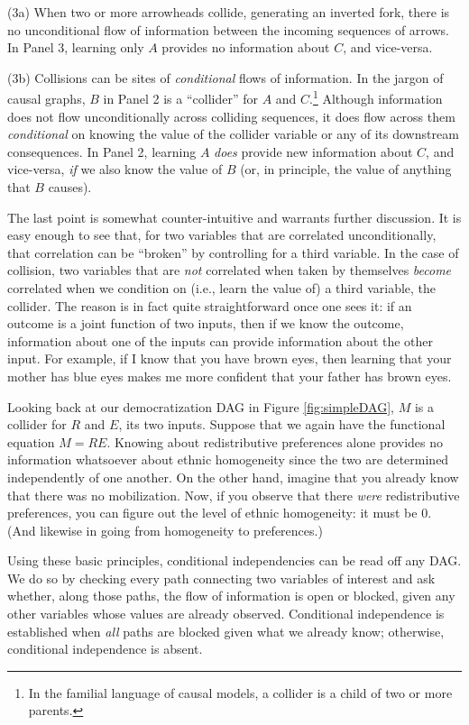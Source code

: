 \documentclass[12pt,]{book}
\let\rmarkdownfootnote\footnote%
\def\footnote{\protect\rmarkdownfootnote}
\begin{document}
(3a) When two or more arrowheads collide, generating an inverted fork, there is no unconditional flow of information between the incoming sequences of arrows. In Panel 3, learning only \(A\) provides no information about \(C\), and vice-versa.

(3b) Collisions can be sites of \emph{conditional} flows of information. In the jargon of causal graphs, \(B\) in Panel 2 is a ``collider'' for \(A\) and \(C\).\footnote{In the familial language of causal models, a collider is a child of two or more parents.} Although information does not flow unconditionally across colliding sequences, it does flow across them \emph{conditional} on knowing the value of the collider variable or any of its downstream consequences. In Panel 2, learning \(A\) \emph{does} provide new information about \(C\), and vice-versa, \emph{if} we also know the value of \(B\) (or, in principle, the value of anything that \(B\) causes).

The last point is somewhat counter-intuitive and warrants further discussion. It is easy enough to see that, for two variables that are correlated unconditionally, that correlation can be ``broken'' by controlling for a third variable. In the case of collision, two variables that are \emph{not} correlated when taken by themselves \emph{become} correlated when we condition on (i.e., learn the value of) a third variable, the collider. The reason is in fact quite straightforward once one sees it: if an outcome is a joint function of two inputs, then if we know the outcome, information about one of the inputs can provide information about the other input. For example, if I know that you have brown eyes, then learning that your mother has blue eyes makes me more confident that your father has brown eyes.

Looking back at our democratization DAG in Figure \ref{fig:simpleDAG}, \(M\) is a collider for \(R\) and \(E\), its two inputs. Suppose that we again have the functional equation \(M=RE\). Knowing about redistributive preferences alone provides no information whatsoever about ethnic homogeneity since the two are determined independently of one another. On the other hand, imagine that you already know that there was no mobilization. Now, if you observe that there \emph{were} redistributive preferences, you can figure out the level of ethnic homogeneity: it must be 0. (And likewise in going from homogeneity to preferences.)

Using these basic principles, conditional independencies can be read off any DAG. We do so by checking every path connecting two variables of interest and ask whether, along those paths, the flow of information is open or blocked, given any other variables whose values are already observed. Conditional independence is established when \emph{all} paths are blocked given what we already know; otherwise, conditional independence is absent.
\end{document}
